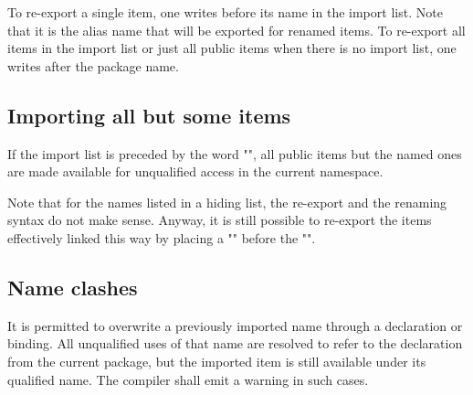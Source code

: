 To re-export a single item, one writes  before its name in the import list. Note that it is the alias name that will be exported for renamed items.
To re-export all items in the import list or just all public items when there is no import list, one writes  after the package name.


\subsection{Importing all but some items}

If the import list is preceded by the word "", all public items but the named ones are made available for unqualified access in the current namespace.


Note that for the names listed in a hiding list, the re-export and the renaming syntax do not make sense. 
Anyway, it is still possible to re-export the items effectively linked this way by placing a "" before the "".


\subsection{Name clashes}

It is permitted to overwrite a previously imported name through a declaration or binding.
All unqualified uses of that name are resolved to refer to the declaration from the current package, 
but the imported item is still available under its qualified name.
The compiler shall emit a warning in such cases.

